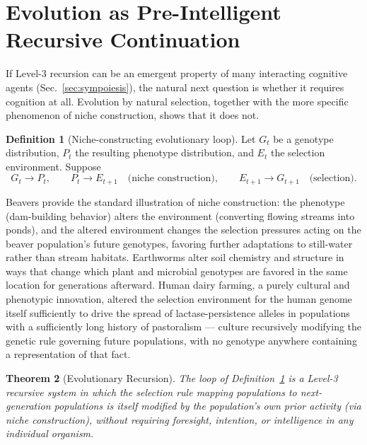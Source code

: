 \documentclass[12pt,a4paper]{article}
\theoremstyle{plain}
\newtheorem{theorem}{Theorem}[section]
\theoremstyle{definition}
\newtheorem{definition}[theorem]{Definition}
\theoremstyle{remark}
\begin{document}
\section{Evolution as Pre-Intelligent Recursive Continuation}
\label{sec:evolution}

If Level-3 recursion can be an emergent property of many interacting cognitive agents (Sec.~\ref{sec:sympoiesis}), the natural next question is whether it requires cognition at all. Evolution by natural selection, together with the more specific phenomenon of niche construction, shows that it does not.

\begin{definition}[Niche-constructing evolutionary loop]
\label{def:evolution-loop}
Let $G_t$ be a genotype distribution, $P_t$ the resulting phenotype distribution, and $E_t$ the selection environment. Suppose
\[
G_t \to P_t, \qquad P_t \to E_{t+1} \quad \text{(niche construction)}, \qquad E_{t+1} \to G_{t+1} \quad \text{(selection)}.
\]
\end{definition}

Beavers provide the standard illustration of niche construction: the phenotype (dam-building behavior) alters the environment (converting flowing streams into ponds), and the altered environment changes the selection pressures acting on the beaver population's future genotypes, favoring further adaptations to still-water rather than stream habitats. Earthworms alter soil chemistry and structure in ways that change which plant and microbial genotypes are favored in the same location for generations afterward. Human dairy farming, a purely cultural and phenotypic innovation, altered the selection environment for the human genome itself sufficiently to drive the spread of lactase-persistence alleles in populations with a sufficiently long history of pastoralism — culture recursively modifying the genetic rule governing future populations, with no genotype anywhere containing a representation of that fact.

\begin{theorem}[Evolutionary Recursion]
\label{thm:evolutionary-recursion}
The loop of Definition~\ref{def:evolution-loop} is a Level-3 recursive system in which the selection rule mapping populations to next-generation populations is itself modified by the population's own prior activity (via niche construction), without requiring foresight, intention, or intelligence in any individual organism.
\end{theorem}
\end{document}
